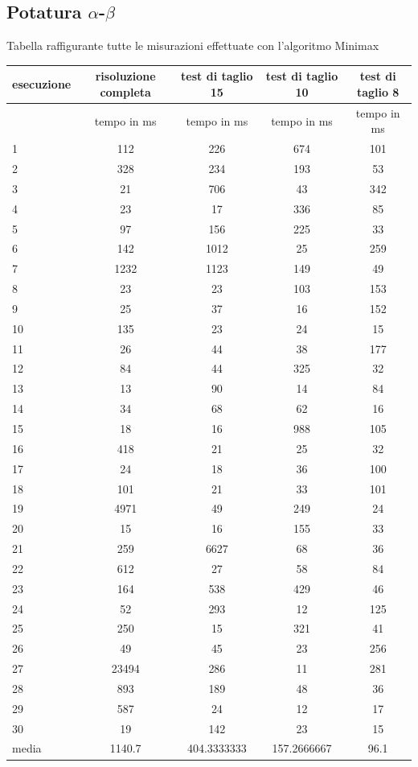 	\subsection{Potatura $\alpha$-$\beta$}
	Tabella raffigurante tutte le misurazioni effettuate con l'algoritmo Minimax\\
	
	\begin{tabular}{|l|c|c|c|c|}
	\hline
	esecuzione      & risoluzione completa	& test di taglio 15	& test di taglio 10	& test di taglio 8 \\
	\hline
		&	tempo in ms	&	tempo in ms	&	tempo in ms	&	tempo in ms\\
	\hline
	1&112	&	226	&	674	&	101\\
	2	&	328	&	234	&	193	&	53\\
	3	&	21	&	706	&	43	&	342\\
	4	&	23	&	17	&	336	&	85\\
	5	&	97	&	156	&	225	&	33\\
	6	&	142	&	1012	&	25	&	259\\
	7	&	1232	&	1123	&	149	&	49\\
	8	&	23	&	23	&	103	&	153\\
	9	&	25	&	37	&	16	&	152\\
	10	&	135	&	23	&	24	&	15\\
	11	&	26	&	44	&	38	&	177\\
	12	&	84	&	44	&	325	&	32\\
	13	&	13	&	90	&	14	&	84\\
	14	&	34	&	68	&	62	&	16\\
	15	&	18	&	16	&	988	&	105\\
	16	&	418	&	21	&	25	&	32\\
	17	&	24	&	18	&	36	&	100\\
	18	&	101	&	21	&	33	&	101\\
	19	&	4971	&	49	&	249	&	24\\
	20	&	15	&	16	&	155	&	33\\
	21	&	259	&	6627	&	68	&	36\\
	22	&	612	&	27	&	58	&	84\\
	23	&	164	&	538	&	429	&	46\\
	24	&	52	&	293	&	12	&	125\\
	25	&	250	&	15	&	321	&	41\\
	26	&	49	&	45	&	23	&	256\\
	27	&	23494	&	286	&	11	&	281\\
	28	&	893	&	189	&	48	&	36\\
	29	&	587	&	24	&	12	&	17\\
	30	&	19	&	142	&	23	&	15\\
	
	\hline
	media		&	1140.7	&	404.3333333	&	157.2666667	&	96.1\\
	\hline
	\end{tabular}
	
